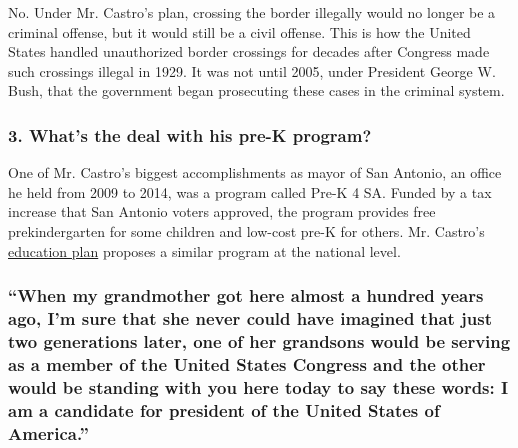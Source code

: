No. Under Mr. Castro's plan, crossing the border illegally would no
longer be a criminal offense, but it would still be a civil offense.
This is how the United States handled unauthorized border crossings for
decades after Congress made such crossings illegal in 1929. It was not
until 2005, under President George W. Bush, that the government began
prosecuting these cases in the criminal system.

\hypertarget{3-whats-the-deal-with-his-pre-k-program}{%
\subsubsection{\texorpdfstring{\textbf{3. What's the deal with his pre-K
program?}}{3. What's the deal with his pre-K program?}}\label{3-whats-the-deal-with-his-pre-k-program}}

One of Mr. Castro's biggest accomplishments as mayor of San Antonio, an
office he held from 2009 to 2014, was a program called Pre-K 4 SA.
Funded by a tax increase that San Antonio voters approved, the program
provides free prekindergarten for some children and low-cost pre-K for
others. Mr. Castro's
\href{https://www.nytimes.com/2019/05/13/us/politics/julian-castro-education-2020.html}{education
plan} proposes a similar program at the national level.

\hypertarget{when-my-grandmother-got-here-almost-a-hundred-years-ago-im-sure-that-she-never-could-have-imagined-that-just-two-generations-later-one-of-her-grandsons-would-be-serving-as-a-member-of-the-united-states-congress-and-the-other-would-be-standing-with-you-here-today-to-say-these-words-i-am-a-candidate-for-president-of-the-united-states-of-america}{%
\subsubsection{``When my grandmother got here almost a hundred years
ago, I'm sure that she never could have imagined that just two
generations later, one of her grandsons would be serving as a member of
the United States Congress and the other would be standing with you here
today to say these words: I am a candidate for president of the United
States of
America.''}\label{when-my-grandmother-got-here-almost-a-hundred-years-ago-im-sure-that-she-never-could-have-imagined-that-just-two-generations-later-one-of-her-grandsons-would-be-serving-as-a-member-of-the-united-states-congress-and-the-other-would-be-standing-with-you-here-today-to-say-these-words-i-am-a-candidate-for-president-of-the-united-states-of-america}}

